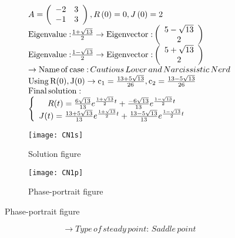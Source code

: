 \documentclass[a4paper]{article}
\begin{document}
\[\begin{array}{l}
A = \left( {\begin{array}{*{20}{c}}
{ - 2}&3\\
{ - 1}&3
\end{array}} \right),R\left( 0 \right) = 0,J\left( 0 \right) = 2\\
{\rm{Eigenvalue:}}\frac{{1 + \sqrt {13} }}{2} \to {\rm{Eigenvector:}}\left( {\begin{array}{*{20}{c}}
{5 - \sqrt {13} }\\
2
\end{array}} \right)\\
{\rm{Eigenvalue:}}\frac{{1 - \sqrt {13} }}{2} \to {\rm{Eigenvector:}}\left( {\begin{array}{*{20}{c}}
{5 + \sqrt {13} }\\
2
\end{array}} \right)\\
 \to {\rm{Name}}\,{\rm{of}}\,{\rm{case:}}\,Cautious\,Lover\,and\,Narcissistic\,Nerd\\
{\rm{Using}}\,{\rm{R(0), J(0)}} \to {{\rm{c}}_1} = \frac{{13 + 5\sqrt {13} }}{{26}},{\rm{ }}{{\rm{c}}_2} = \frac{{13 - 5\sqrt {13} }}{{26}}\\
{\rm{Final}}\,{\rm{solution:}}\\
\left\{ {\begin{array}{*{20}{c}}
{R(t) = \frac{{6\sqrt {13} }}{{13}}{e^{\frac{{1 + \sqrt {13} }}{2}t}} + \frac{{ - 6\sqrt {13} }}{{13}}{e^{\frac{{1 - \sqrt {13} }}{2}t}}}\\
{J(t) = \frac{{13 + 5\sqrt {13} }}{{13}}{e^{\frac{{1 + \sqrt {13} }}{2}t}} + \frac{{13 - 5\sqrt {13} }}{{13}}{e^{\frac{{1 - \sqrt {13} }}{2}t}}}
\end{array}} \right.
\end{array}\]
\begin{figure}[H]
\centering
\begin{subfigure}{.5\textwidth}
  \centering
  \texttt{[image: CN1s]}
  \caption*{Solution figure}
\end{subfigure}%
\begin{subfigure}{.5\textwidth}
  \centering
  \texttt{[image: CN1p]}
  \caption*{Phase-portrait figure}
\end{subfigure}
\end{figure}
\[  \to  Type\,of\,steady\,point:\,Saddle\,point\]
\end{document}
